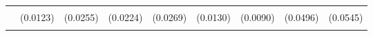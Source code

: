 \begin{table}[!h]
\begin{tabular}[t]{lllllllll}
\addlinespace
\cellcolor{gray!10}{WSLS} & \cellcolor{gray!10}{0.0000} & \cellcolor{gray!10}{0.0411} & \cellcolor{gray!10}{0.0530*} & \cellcolor{gray!10}{0.0586*} & \cellcolor{gray!10}{0.0000} & \cellcolor{gray!10}{0.0000} & \cellcolor{gray!10}{0.1555**} & \cellcolor{gray!10}{0.1250*}\\
 & (0.0123) & (0.0255) & (0.0224) & (0.0269) & (0.0130) & (0.0090) & (0.0496) & (0.0545)\\
\cellcolor{gray!10}{T2} & \cellcolor{gray!10}{0.1984***} & \cellcolor{gray!10}{0.1430**} & \cellcolor{gray!10}{0.0126} & \cellcolor{gray!10}{0.0000} & \cellcolor{gray!10}{0.0000} & \cellcolor{gray!10}{0.0038} & \cellcolor{gray!10}{0.0131} & \cellcolor{gray!10}{0.1686***}\\
\bottomrule
\end{tabular}
\end{table}
